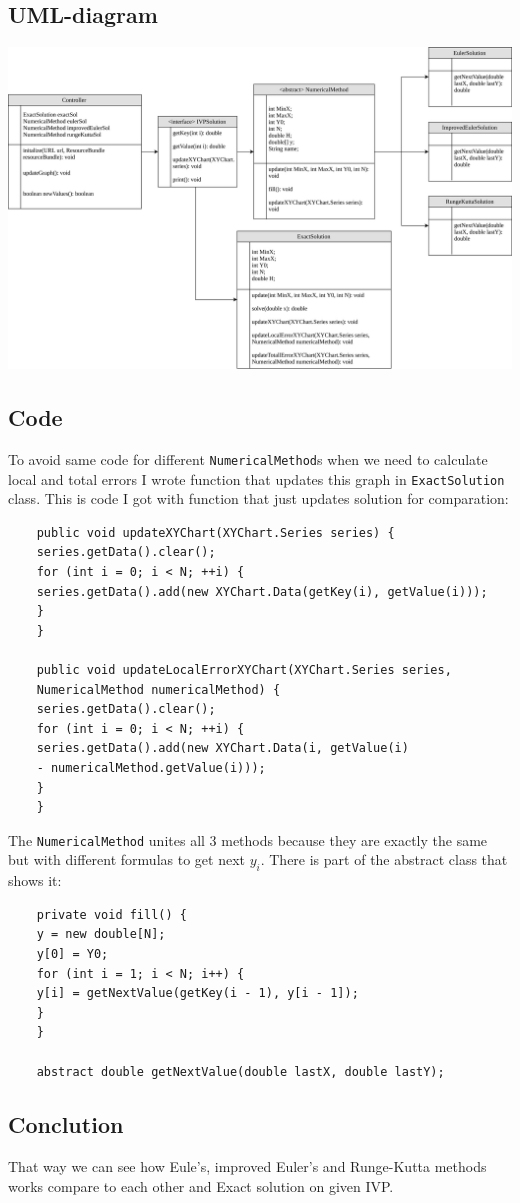 \documentclass{article}
\begin{document}
  \subsection{UML-diagram}
  \includegraphics[scale=0.5]{UML.png}

  \subsection{Code}
  To avoid same code for different \texttt{NumericalMethod}s when we need to calculate local and total errors
  I wrote function that updates this graph in \texttt{ExactSolution} class. This is code I got with function
  that just updates solution for comparation:


  \begin{verbatim}
    public void updateXYChart(XYChart.Series series) {
    series.getData().clear();
    for (int i = 0; i < N; ++i) {
    series.getData().add(new XYChart.Data(getKey(i), getValue(i)));
    }
    }

    public void updateLocalErrorXYChart(XYChart.Series series,
    NumericalMethod numericalMethod) {
    series.getData().clear();
    for (int i = 0; i < N; ++i) {
    series.getData().add(new XYChart.Data(i, getValue(i)
    - numericalMethod.getValue(i)));
    }
    }

  \end{verbatim}

  The \texttt{NumericalMethod} unites all 3 methods because they are exactly the same
  but with different formulas to get next $y_i$. There is part of the abstract class that shows it:

  \begin{verbatim}
    private void fill() {
    y = new double[N];
    y[0] = Y0;
    for (int i = 1; i < N; i++) {
    y[i] = getNextValue(getKey(i - 1), y[i - 1]);
    }
    }

    abstract double getNextValue(double lastX, double lastY);
  \end{verbatim}

  \subsection{Conclution}

  That way we can see how Eule's, improved Euler's and Runge-Kutta methods works compare to each other
  and Exact solution on given IVP.
\end{document}
